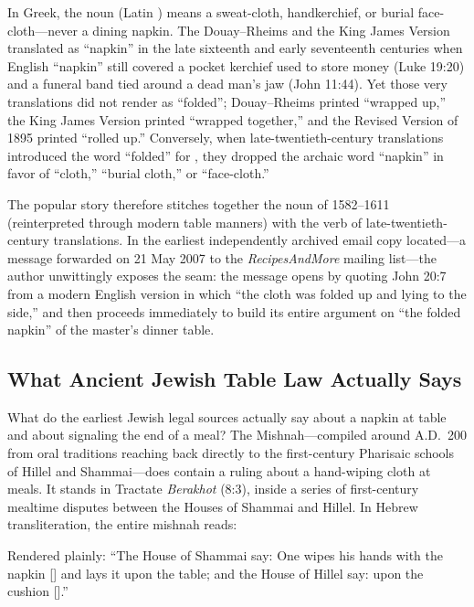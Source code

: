 In Greek, the noun  (Latin ) means a sweat-cloth, handkerchief, or burial face-cloth---never a dining napkin. The Douay--Rheims and the King James Version translated  as ``napkin'' in the late sixteenth and early seventeenth centuries when English ``napkin'' still covered a pocket kerchief used to store money (Luke 19:20) and a funeral band tied around a dead man's jaw (John 11:44). Yet those very translations did not render  as ``folded''; Douay--Rheims printed ``wrapped up,'' the King James Version printed ``wrapped together,'' and the Revised Version of 1895 printed ``rolled up.'' Conversely, when late-twentieth-century translations introduced the word ``folded'' for , they dropped the archaic word ``napkin'' in favor of ``cloth,'' ``burial cloth,'' or ``face-cloth.''

The popular story therefore stitches together the noun of 1582--1611 (reinterpreted through modern table manners) with the verb of late-twentieth-century translations. In the earliest independently archived email copy located---a message forwarded on 21 May 2007 to the \emph{RecipesAndMore} mailing list---the author unwittingly exposes the seam: the message opens by quoting John 20:7 from a modern English version in which ``the cloth was folded up and lying to the side,'' and then proceeds immediately to build its entire argument on ``the folded napkin'' of the master's dinner table.

\subsection{What Ancient Jewish Table Law Actually Says}

What do the earliest Jewish legal sources actually say about a napkin at table and about signaling the end of a meal? The Mishnah---compiled around A.D.~200 from oral traditions reaching back directly to the first-century Pharisaic schools of Hillel and Shammai---does contain a ruling about a hand-wiping cloth at meals. It stands in Tractate \emph{Berakhot} (8:3), inside a series of first-century mealtime disputes between the Houses of Shammai and Hillel. In Hebrew transliteration, the entire mishnah reads:
\begin{quote}
\end{quote}
Rendered plainly: ``The House of Shammai say: One wipes his hands with the napkin [] and lays it upon the table; and the House of Hillel say: upon the cushion [].''

